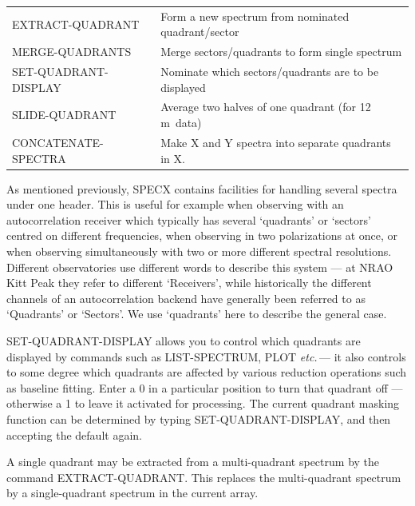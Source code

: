 \documentclass[11pt,twoside]{report}
\newcommand{\etc}{{\it etc.\,}}
\newcommand{\m}{{\rm\,m}}
\begin{document}
\begin{tabular}{ll}
EXTRACT-QUADRANT       & Form a new spectrum from nominated quadrant/sector\\
MERGE-QUADRANTS        & Merge sectors/quadrants to form single spectrum\\
SET-QUADRANT-DISPLAY   & Nominate which sectors/quadrants are to be displayed\\
SLIDE-QUADRANT         & Average two halves of one quadrant (for 12\m\ data)\\
CONCATENATE-SPECTRA    & Make X and Y spectra into separate quadrants in X.\\
\end{tabular}

As mentioned previously, SPECX contains facilities for handling several spectra
under one header. This is useful for example when observing with an
autocorrelation receiver  which typically
has several `quadrants' or `sectors' centred on different frequencies, when
observing in two polarizations  at once, or when
observing simultaneously with two or more different spectral resolutions.
 Different observatories use different words to
describe this system --- at NRAO Kitt Peak they refer to different `Receivers',
 while historically the different channels of an
autocorrelation backend have generally been referred to as `Quadrants' or
`Sectors'. We use `quadrants' here to describe the general case. 

SET-QUADRANT-DISPLAY allows you to control which quadrants are displayed by
commands such as LIST-SPECTRUM, PLOT \etc --- it also controls to some degree
which quadrants are affected by various reduction operations
such as baseline fitting. Enter a 0 in a particular position to turn that
quadrant off --- otherwise a 1 to leave it activated for processing. The current
quadrant masking function can be determined by
typing SET-QUADRANT-DISPLAY, and then accepting the default again. 

 A single quadrant may be extracted
from a multi-quadrant spectrum by the command EXTRACT-QUADRANT. This replaces
the multi-quadrant spectrum by a single-quadrant spectrum in the current array.
\end{document}
